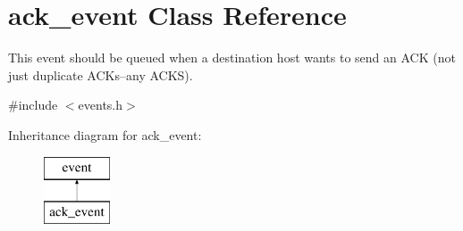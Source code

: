 \hypertarget{classack__event}{\section{ack\-\_\-event Class Reference}
\label{classack__event}
}


This event should be queued when a destination host wants to send an A\-C\-K (not just duplicate A\-C\-Ks--any A\-C\-K\-S).  




{\ttfamily \#include $<$events.\-h$>$}

Inheritance diagram for ack\-\_\-event\-:\begin{figure}[H]
\begin{center}
\leavevmode
\includegraphics[height=2.000000cm]{classack__event}
\end{center}
\end{figure}
